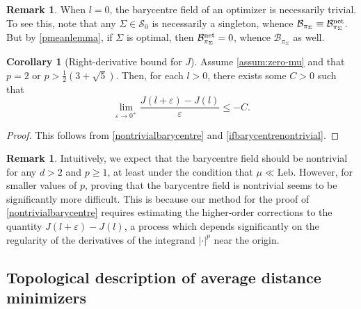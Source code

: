\documentclass[preprint, reqno]{amsart}
\renewcommand{\epsilon}{\varepsilon}
\theoremstyle{definition}
\newtheorem{corollary}[definition]{Corollary}
\newtheorem{remark}[definition]{Remark}
\numberwithin{equation}{section}
\begin{document}
\begin{remark}
  When $l = 0$, the barycentre field of an optimizer is necessarily
  trivial. To see this, note that any $\Sigma \in \mathcal{S}_0$ is
  necessarily a singleton, whence $\mathcal B_{\pi_\Sigma} \equiv
  \mathcal B_{\pi_\Sigma}^{\rm net}$. But by \cref{pmeanlemma}, if
  $\Sigma$ is optimal, then $\mathcal B_{\pi_\Sigma}^{\rm net} = 0$,
  whence $\mathcal B_{\pi_\Sigma}$ as well.
\end{remark}


\begin{corollary}[Right-derivative bound for
  $J$]\label{epsilonimprovement} Assume \eqref{assum:zero-mu} and that
  $p = 2$ or $p > \frac{1}{2}(3 + \sqrt{5})$. Then, for each $l > 0$,
  there exists some $C > 0$ such that
  \[
    \lim_{\epsilon \to 0^+}\frac{J(l + \epsilon) - J(l)}{\epsilon}
    \leq -C.
  \]
\end{corollary}

\begin{proof}
  This follows from \cref{nontrivialbarycentre} and
  \cref{ifbarycentrenontrivial}.
\end{proof}

\begin{remark} Intuitively, we expect that the barycentre field should
  be nontrivial for any $d > 2$ and $p \geq 1$, at least under the
  condition that $\mu \ll \mathrm{Leb}$. However, for smaller values
  of $p$, proving that the barycentre field is nontrivial seems to be
  significantly more difficult. This is because our method for the
  proof of \cref{nontrivialbarycentre} requires estimating the
  higher-order corrections to the quantity $J(l + \epsilon) - J(l)$, a
  process which depends significantly on the regularity of the
  derivatives of the integrand $|\cdot|^p$ near the origin.
\end{remark}



\subsection{Topological description of average distance
  minimizers}\label{sec:topology}
\end{document}
